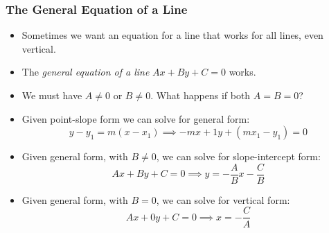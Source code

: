 \documentclass[serif,ignorenonframetext]{beamer}
\begin{document}
\begin{frame}
  \frametitle{The General Equation of a Line}
    \begin{itemize}[<+->]
    \item Sometimes we want an equation for a line that works for all
      lines, even vertical.
    \item The \textit{general equation of a line} $Ax+By+C=0$ works.
    \item We must have $A\ne 0$ or $B\ne 0$.  What happens if both $A=B=0$?
    \item Given point-slope form we can solve for general form:
      \begin{equation*}
        y-y_1 = m(x-x_1) \implies -mx + 1y + (mx_1-y_1) = 0
      \end{equation*}
    \item Given general form, with $B\ne 0$, we can solve for
      slope-intercept form:
      \begin{equation*}
        Ax + By + C=0 \implies y = -\frac{A}{B} x - \frac{C}{B}
      \end{equation*}
    \item Given general form, with $B=0$, we can solve for
      vertical form:
      \begin{equation*}
        Ax + 0y + C = 0 \implies x = -\frac{C}{A}
      \end{equation*}
    \end{itemize}
\end{frame}
\end{document}
